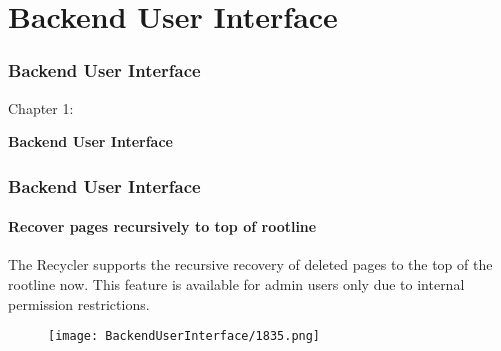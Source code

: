 %

\section{Backend User Interface}
\begin{frame}[fragile]
	\frametitle{Backend User Interface}

	\begin{center}\huge{Chapter 1:}\end{center}
	\begin{center}\huge{\color{typo3darkgrey}\textbf{Backend User Interface}}\end{center}

\end{frame}

\begin{frame}[fragile]
	\frametitle{Backend User Interface}
	\framesubtitle{Recover pages recursively to top of rootline}

	The Recycler supports the recursive recovery of deleted pages to the top of the rootline now.
	This feature is available for admin users only due to internal permission restrictions.

	\begin{figure}
		\texttt{[image: BackendUserInterface/1835.png]}
	\end{figure}

\end{frame}

